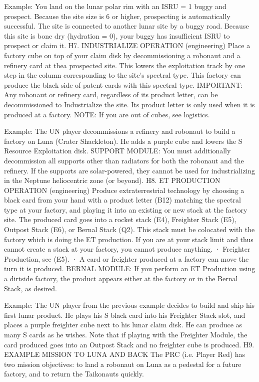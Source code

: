 \documentclass[a4paper]{book}
\begin{document}
Example: You land on the lunar polar rim with an ISRU = 1 buggy and prospect. Because the site size is 6 or higher, prospecting is automatically successful. The site is connected to another lunar site by a buggy road. Because this site is bone dry (hydration = 0), your buggy has insufficient ISRU to prospect or claim it.
H7. INDUSTRIALIZE OPERATION (engineering)
Place a factory cube on top of your claim disk by decommissioning a robonaut and a refinery card at thea prospected site. This lowers the exploitation track by one step in the column corresponding to the site’s spectral type. This factory can produce the black side of patent cards with this spectral type.
IMPORTANT: Any robonaut or refinery card, regardless of its product letter, can be decommissioned to Industrialize the site. Its product letter is only used when it is produced at a factory.
NOTE: If you are out of cubes, see logistics.

Example: The UN player decommissions a refinery and robonaut to build a factory on Luna (Crater Shackleton). He adds a purple cube and lowers the S Resource Exploitation disk.
SUPPORT MODULE: You must additionally decommission all supports other than radiators for both the robonaut and the refinery. If the supports are solar-powered, they cannot be used for industrializing in the Neptune heliocentric zone (or beyond).
H8. ET PRODUCTION OPERATION (engineering)
Produce extraterrestrial technology by choosing a black card from your hand with a product letter (B12) matching the spectral type at your factory, and playing it into an existing or new stack at the factory site.
The produced card goes into a rocket stack (E4), Freighter Stack (E5), Outpost Stack (E6), or Bernal Stack (Q2). This stack must be colocated with the factory which is doing the ET production. If you are at your stack limit and thus cannot create a stack at your factory, you cannot produce anything.
·       Freighter Production, see (E5). 
·       A card or freighter produced at a factory can move the turn it is produced.
BERNAL MODULE: If you perform an ET Production using a dirtside factory, the product appears either at the factory or in the Bernal Stack, as desired.

Example: The UN player from the previous example decides to build and ship his first lunar product. He plays his S black card into his Freighter Stack slot, and places a purple freighter cube next to his lunar claim disk. He can produce as many S cards as he wishes. Note that if playing with the Freighter Module, the card produced goes into an Outpost Stack and no freighter cube is produced.
H9. EXAMPLE MISSION TO LUNA AND BACK
The PRC (i.e. Player Red) has two mission objectives: to land a robonaut on Luna as a pedestal for a future factory, and to return the Taikonauts quickly.
\end{document}
